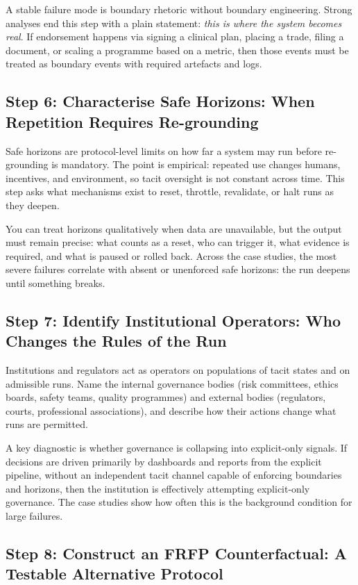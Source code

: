 A stable failure mode is boundary rhetoric without boundary engineering. Strong analyses end this step with a plain statement: \emph{this is where the system becomes real}. If endorsement happens via signing a clinical plan, placing a trade, filing a document, or scaling a programme based on a metric, then those events must be treated as boundary events with required artefacts and logs.

\subsection{Step 6: Characterise Safe Horizons: When Repetition Requires Re-grounding}

Safe horizons are protocol-level limits on how far a system may run before re-grounding is mandatory. The point is empirical: repeated use changes humans, incentives, and environment, so tacit oversight is not constant across time. This step asks what mechanisms exist to reset, throttle, revalidate, or halt runs as they deepen.

You can treat horizons qualitatively when data are unavailable, but the output must remain precise: what counts as a reset, who can trigger it, what evidence is required, and what is paused or rolled back. Across the case studies, the most severe failures correlate with absent or unenforced safe horizons: the run deepens until something breaks.

\subsection{Step 7: Identify Institutional Operators: Who Changes the Rules of the Run}

Institutions and regulators act as operators on populations of tacit states and on admissible runs. Name the internal governance bodies (risk committees, ethics boards, safety teams, quality programmes) and external bodies (regulators, courts, professional associations), and describe how their actions change what runs are permitted.

A key diagnostic is whether governance is collapsing into explicit-only signals. If decisions are driven primarily by dashboards and reports from the explicit pipeline, without an independent tacit channel capable of enforcing boundaries and horizons, then the institution is effectively attempting explicit-only governance. The case studies show how often this is the background condition for large failures.

\subsection{Step 8: Construct an FRFP Counterfactual: A Testable Alternative Protocol}

